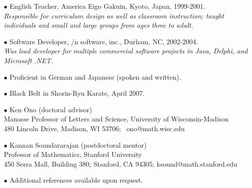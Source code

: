 \documentclass{article}
\newcommand{\categorywidth}{1in}        %
\newcommand{\categorysep}{5pt}
\newcommand{\catlistlabel}[1]%
{\raisebox{0pt}[1ex][0pt]{\makebox[\labelwidth][l]%
    {\parbox[t]{\labelwidth}{\hspace{0pt}\textbf{#1}}}}}
\newenvironment{categories}{\begin{list}{}{
      \setlength{\labelwidth}{\categorywidth}
      \setlength{\leftmargin}{\labelwidth}
      \addtolength{\leftmargin}{\labelsep}
      \setlength{\topsep}{20pt}
      \setlength{\itemsep}{\categorysep}
      \renewcommand{\makelabel}{\catlistlabel}
      }}{\end{list}}
\newcommand{\category}[1]{\item[#1]}
\begin{document}
\begin{flushleft}
\begin{categories}
  $\bullet$ {English Teacher, America Eigo Gakuin, Kyoto, Japan, 1999-2001. \\
  \itshape Responsible for curriculum design as well as classroom instruction;
taught individuals and small and large groups from ages three to adult. \upshape}

  $\bullet$ {Software Developer, /n software, inc., Durham, NC, 2002-2004. \\
  \itshape Was lead developer for multiple commercial software projects in
Java, Delphi, and Microsoft .NET. \upshape}

  \category{Personal}

  $\bullet$ {Proficient in German and Japanese (spoken and written).}

  $\bullet$ {Black Belt in Shorin-Ryu Karate, April 2007.}

  \category{References}

  $\bullet$ {Ken Ono (doctoral advisor) \\
            Manasse Professor of Letters and Science, University of Wisconsin-Madison \\
            480 Lincoln Drive, Madison, WI 53706; \ ono@math.wisc.edu}

  $\bullet$ {Kannan Soundararajan (postdoctoral mentor)\\
            Professor of Mathematics, Stanford University \\
            450 Serra Mall, Building 380, Stanford, CA 94305; ksound@math.stanford.edu}
  
  $\bullet$ {Additional references available upon request.}

\end{categories}



\end{flushleft}
\end{document}
